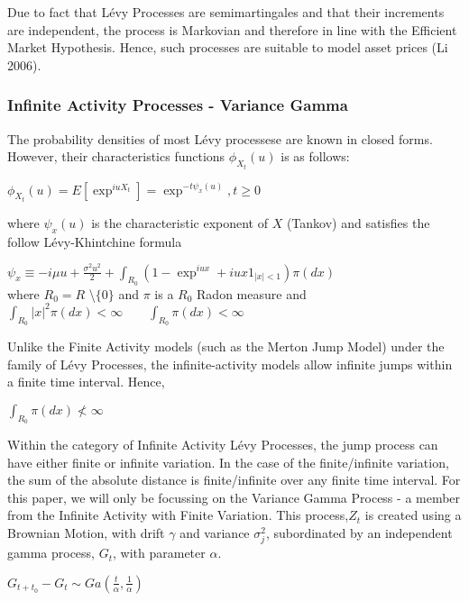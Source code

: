 \documentclass[11pt]{article}
\theoremstyle{definition}
\begin{document}
\justify Due to fact that L\'{e}vy Processes are semimartingales and that their increments are independent, the process is Markovian and therefore in line with the Efficient Market Hypothesis. Hence, such processes are suitable to model asset prices (Li 2006). 
\subsubsection{Infinite Activity Processes - Variance Gamma}
The probability densities of most L\'{e}vy processese are known in closed forms. However, their characteristics functions $\phi_{X_{t}}(u)$ is as follows:
\begin{center}
$
\phi_{X_{t}}(u) = E[\exp^{iuX_{t}}] = \exp^{-t\psi_{x}(u)},t\ge 0
$
\end{center}


\justify where $\psi_{x}(u)$ is the characteristic exponent of $X$ (Tankov) and satisfies the follow L\'{e}vy-Khintchine formula
\begin{center}
$\psi_{x}\equiv -i\mu u + \frac{\sigma^{2}u^{2}}{2} + \int_{R_{0}} (1-\exp^{iux}+iux1_{|x|<1})\pi (dx) $\\
where $R_{0} = R$ \textbackslash $\{0\}$ and $\pi$ is a $R_{0}$ Radon measure and \\
$\int_{R_{0}} |x|^{2} \pi (dx)< \infty \qquad \int_{R_{0}} \pi (dx) < \infty$
\end{center}

Unlike the Finite Activity models (such as the Merton Jump Model) under the family of L\'{e}vy Processes, the infinite-activity models allow infinite jumps within a finite time interval. Hence,
\begin{center}
$\int_{R_{0}} \pi (dx) \not< \infty$
\end{center}

Within the category of Infinite Activity L\'{e}vy Processes, the jump process can have either finite or infinite variation. In the case of the finite/infinite variation, the sum of the absolute distance is finite/infinite over any finite time interval. For this paper, we will only be focussing on the Variance Gamma Process - a member from the Infinite Activity with Finite Variation. This process,$Z_{t}$ is created using a Brownian Motion, with drift $\gamma$ and variance $\sigma_{j}^2$, subordinated by an independent gamma process, $G_{t}$, with parameter $\alpha$.
\begin{center}
$G_{t+t_{0}} - G_{t} \sim Ga(\frac{t}{\alpha},\frac{1}{\alpha})$
\end{center}
\end{document}
